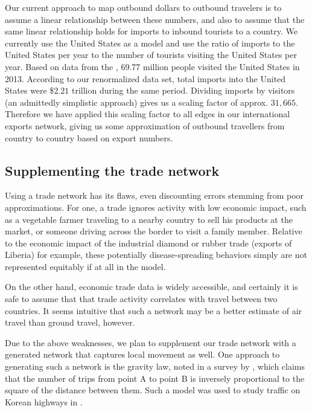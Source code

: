 \documentclass[10pt, journal,onecolumn]{IEEEtran}
\begin{document}
Our current approach to map outbound dollars to outbound travelers is to assume a linear relationship
between these numbers, and also to assume that the same linear relationship holds for imports to
inbound tourists to a country.
We currently use the United States as a model and use the ratio of
imports to the United States per year to the number of tourists visiting the United States per year.
Based on data from the \cite{usinboundtourists}, 69.77 million people visited the United States in 2013.
According to our renormalized data set, total imports into the United States were
\$$2.21$ trillion during the same period. Dividing imports by visitors (an admittedly
simplistic approach) gives us a scaling factor of approx. $31,665$. Therefore we have applied this
scaling factor to all edges in our international exports network, giving us some approximation of
outbound travellers from country to country based on export numbers.

\subsection*{\textbf{Supplementing the trade network}}

Using a trade network has its flaws, even discounting errors stemming from poor approximations.
For one, a trade ignores activity with low economic impact, such as
a vegetable farmer traveling to a nearby country to sell his products at the market, or someone
driving across the border to visit a family member. Relative to the economic impact of the industrial
diamond or rubber trade (exports of Liberia) for example, these potentially disease-spreading behaviors
simply are not represented equitably if at all in the model.

On the other hand, economic trade data is widely accessible, and certainly it is safe to assume that
that trade activity correlates with travel between two countries. It seems intuitive that
such a network may be a better estimate of air travel than ground travel, however.

Due to the above weaknesses, we plan to supplement our trade network with a generated network that
captures local movement as well. One approach to generating such a network is the gravity law,
noted in a survey by \cite{barthelemy2011spatial}, which claims that the number of trips from
point A to point B is inversely proportional to the square of the distance between them.
Such a model was used to study traffic on Korean highways in \cite{jung2008gravity}.
\end{document}
